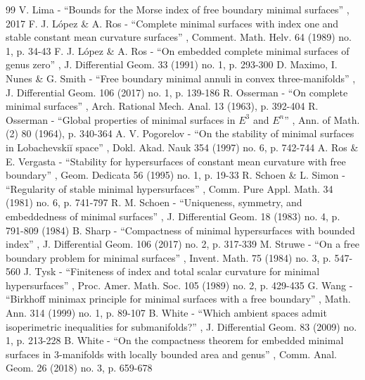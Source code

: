 \documentclass[10pt]{amsart}
\theoremstyle{definition}
\begin{document}
\begin{thebibliography}{99}
 V. Lima - “Bounds for the Morse index of free boundary minimal surfaces” , 2017
 F. J. López \& A. Ros - “Complete minimal surfaces with index one and stable constant mean curvature surfaces” , Comment. Math. Helv. 64 (1989) no. 1, p. 34-43
 F. J. López \& A. Ros - “On embedded complete minimal surfaces of genus zero” , J. Differential Geom. 33 (1991) no. 1, p. 293-300
 D. Maximo, I. Nunes \& G. Smith - “Free boundary minimal annuli in convex three-manifolds” , J. Differential Geom. 106 (2017) no. 1, p. 139-186
 R. Osserman - “On complete minimal surfaces” , Arch. Rational Mech. Anal. 13 (1963), p. 392-404
 R. Osserman - “Global properties of minimal surfaces in $E^{3}$ and $E^{n}$” , Ann. of Math. (2) 80 (1964), p. 340-364
 A. V. Pogorelov - “On the stability of minimal surfaces in Lobachevskiĭ space” , Dokl. Akad. Nauk 354 (1997) no. 6, p. 742-744
 A. Ros \& E. Vergasta - “Stability for hypersurfaces of constant mean curvature with free boundary” , Geom. Dedicata 56 (1995) no. 1, p. 19-33
 R. Schoen \& L. Simon - “Regularity of stable minimal hypersurfaces” , Comm. Pure Appl. Math. 34 (1981) no. 6, p. 741-797
 R. M. Schoen - “Uniqueness, symmetry, and embeddedness of minimal surfaces” , J. Differential Geom. 18 (1983) no. 4, p. 791-809 (1984)
 B. Sharp - “Compactness of minimal hypersurfaces with bounded index” , J. Differential Geom. 106 (2017) no. 2, p. 317-339
 M. Struwe - “On a free boundary problem for minimal surfaces” , Invent. Math. 75 (1984) no. 3, p. 547-560
 J. Tysk - “Finiteness of index and total scalar curvature for minimal hypersurfaces” , Proc. Amer. Math. Soc. 105 (1989) no. 2, p. 429-435
 G. Wang - “Birkhoff minimax principle for minimal surfaces with a free boundary” , Math. Ann. 314 (1999) no. 1, p. 89-107
 B. White - “Which ambient spaces admit isoperimetric inequalities for submanifolds?” , J. Differential Geom. 83 (2009) no. 1, p. 213-228
 B. White - “On the compactness theorem for embedded minimal surfaces in 3-manifolds with locally bounded area and genus” , Comm. Anal. Geom. 26 (2018) no. 3, p. 659-678
\end{thebibliography}
\end{document}

